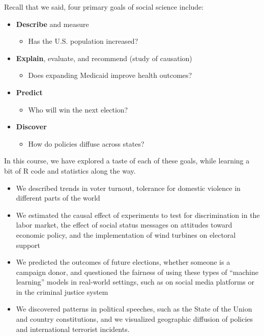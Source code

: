 \documentclass[
  letterpaper,
  DIV=11,
  numbers=noendperiod]{scrreprt}
\providecommand{\tightlist}{%
  \setlength{\itemsep}{0pt}\setlength{\parskip}{0pt}}\usepackage{longtable,booktabs,array}
\begin{document}
Recall that we said, four primary goals of social science include:

\begin{itemize}
\tightlist
\item
  \textbf{Describe} and measure

  \begin{itemize}
  \tightlist
  \item
    Has the U.S. population increased?
  \end{itemize}
\item
  \textbf{Explain}, evaluate, and recommend (study of causation)

  \begin{itemize}
  \tightlist
  \item
    Does expanding Medicaid improve health outcomes?
  \end{itemize}
\item
  \textbf{Predict}

  \begin{itemize}
  \tightlist
  \item
    Who will win the next election?
  \end{itemize}
\item
  \textbf{Discover}

  \begin{itemize}
  \tightlist
  \item
    How do policies diffuse across states?
  \end{itemize}
\end{itemize}

In this course, we have explored a taste of each of these goals, while
learning a bit of R code and statistics along the way.

\begin{itemize}
\tightlist
\item
  We described trends in voter turnout, tolerance for domestic violence
  in different parts of the world
\item
  We estimated the causal effect of experiments to test for
  discrimination in the labor market, the effect of social status
  messages on attitudes toward economic policy, and the implementation
  of wind turbines on electoral support
\item
  We predicted the outcomes of future elections, whether someone is a
  campaign donor, and questioned the fairness of using these types of
  ``machine learning'' models in real-world settings, such as on social
  media platforms or in the criminal justice system
\item
  We discovered patterns in political speeches, such as the State of the
  Union and country constitutions, and we visualized geographic
  diffusion of policies and international terrorist incidents.
\end{itemize}
\end{document}

